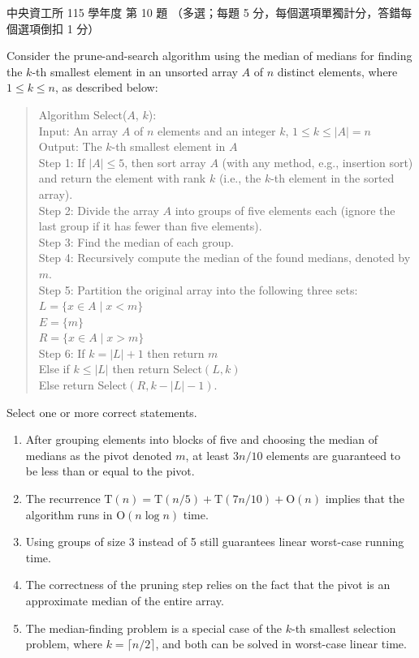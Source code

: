 \begin{pastexam}[label={px:ncu-115-dsa-10}]{中央資工所 115 學年度 第 10 題}
（多選；每題 5 分，每個選項單獨計分，答錯每個選項倒扣 1 分）

Consider the prune-and-search algorithm using the median of medians for finding the $k$-th smallest element in an unsorted array $A$ of $n$ distinct elements, where $1\le k\le n$, as described below:

\begin{quote}
Algorithm Select($A$, $k$):\\
Input: An array $A$ of $n$ elements and an integer $k$, $1\le k\le |A|=n$\\
Output: The $k$-th smallest element in $A$\\
Step 1: If $|A|\le 5$, then sort array $A$ (with any method, e.g., insertion sort) and return the element with rank $k$ (i.e., the $k$-th element in the sorted array).\\
Step 2: Divide the array $A$ into groups of five elements each (ignore the last group if it has fewer than five elements).\\
Step 3: Find the median of each group.\\
Step 4: Recursively compute the median of the found medians, denoted by $m$.\\
Step 5: Partition the original array into the following three sets:\\
$L=\{x\in A\mid x<m\}$\\
$E=\{m\}$\\
$R=\{x\in A\mid x>m\}$\\
Step 6: If $k=|L|+1$ then return $m$\\
\hspace*{3.2em}Else if $k\le|L|$ then return Select$(L,k)$\\
\hspace*{3.2em}Else return Select$(R,k-|L|-1)$.
\end{quote}

Select one or more correct statements.
\begin{enumerate}[label=\Alph*.]
\item After grouping elements into blocks of five and choosing the median of medians as the pivot denoted $m$, at least $3n/10$ elements are guaranteed to be less than or equal to the pivot.
\item The recurrence $\mathrm{T}(n)=\mathrm{T}(n/5)+\mathrm{T}(7n/10)+\mathrm{O}(n)$ implies that the algorithm runs in $\mathrm{O}(n\log n)$ time.
\item Using groups of size 3 instead of 5 still guarantees linear worst-case running time.
\item The correctness of the pruning step relies on the fact that the pivot is an approximate median of the entire array.
\item The median-finding problem is a special case of the $k$-th smallest selection problem, where $k=\lceil n/2\rceil$, and both can be solved in worst-case linear time.
\end{enumerate}
\end{pastexam}

